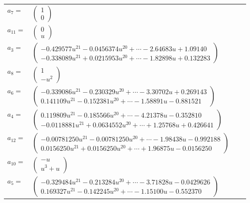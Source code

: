 \documentclass[1p]{elsarticle_modified}
\theoremstyle{definition}
\begin{document}
\begin{tabular}{m{7pt} m{180pt} m{7pt} m{180pt} }
\flushright $a_{7}=$&$\begin{pmatrix}1\\0\end{pmatrix}$ \\
\flushright $a_{11}=$&$\begin{pmatrix}0\\u\end{pmatrix}$ \\
\flushright $a_{3}=$&$\begin{pmatrix}-0.429577 u^{21}-0.0456374 u^{20}+\cdots-2.64683 u+1.09140\\-0.338089 u^{21}+0.0215953 u^{20}+\cdots-1.82898 u+0.132283\end{pmatrix}$ \\
\flushright $a_{8}=$&$\begin{pmatrix}1\\- u^2\end{pmatrix}$ \\
\flushright $a_{6}=$&$\begin{pmatrix}-0.339086 u^{21}-0.230329 u^{20}+\cdots-3.30702 u+0.269143\\0.141109 u^{21}-0.152381 u^{20}+\cdots-1.58891 u-0.881521\end{pmatrix}$ \\
\flushright $a_{4}=$&$\begin{pmatrix}0.119809 u^{21}-0.185566 u^{20}+\cdots-4.21378 u-0.352810\\-0.0118881 u^{21}+0.0634552 u^{20}+\cdots+1.25768 u+0.426641\end{pmatrix}$ \\
\flushright $a_{12}=$&$\begin{pmatrix}-0.00781250 u^{21}-0.00781250 u^{20}+\cdots-1.98438 u-0.992188\\0.0156250 u^{21}+0.0156250 u^{20}+\cdots+1.96875 u-0.0156250\end{pmatrix}$ \\
\flushright $a_{10}=$&$\begin{pmatrix}- u\\u^3+u\end{pmatrix}$ \\
\flushright $a_{5}=$&$\begin{pmatrix}-0.329484 u^{21}-0.213284 u^{20}+\cdots-3.71828 u-0.0429626\\0.169327 u^{21}-0.142245 u^{20}+\cdots-1.15100 u-0.552370\end{pmatrix}$ \\

\end{tabular}
\end{document}
